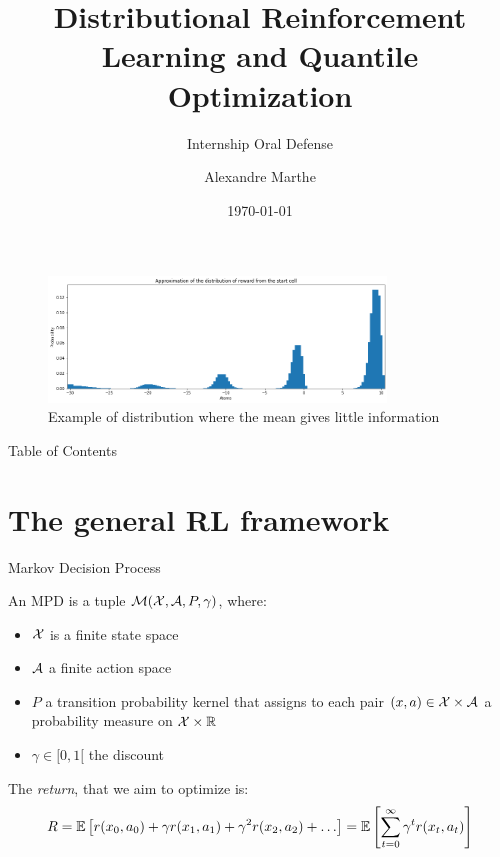 \documentclass[10pt]{beamer}
\title{Distributional Reinforcement Learning and Quantile Optimization}
\subtitle{Internship Oral Defense}
\author{Alexandre Marthe}
\institute{ENS de Lyon}
\date{\today}
\begin{document}

\begin{frame}
\titlepage
\end{frame}

\begin{frame}
    \begin{figure}
        \centering
            \includegraphics[width=0.8\textwidth]{figures/personal_work/distrib_q80.png}
        \caption{Example of distribution where the mean gives little information}
    \end{figure}
\end{frame}

\begin{frame}{Table of Contents}
    \tableofcontents
\end{frame}

\section{The general RL framework}
\begin{frame}{Markov Decision Process\cite{szepesvari2010algorithms}}
    \begin{definition}
        An MPD is a tuple $\mathcal{M}(\mathcal{X}, \mathcal{A}, P, \gamma)$, where:
        \begin{itemize}
            \item $\mathcal{X}$ is a finite state space
            \item $\mathcal{A}$ a finite action space
            \item $P$ a transition probability kernel that assigns to each pair $(x,a) \in \mathcal{X} \times \mathcal{A}$ a probability measure on $\mathcal{X} \times \mathbb{R}$
            \item $\gamma \in [0,1[$ the discount
        \end{itemize}
        
        \end{definition}
        The \emph{return}, that we aim to optimize is:
        \[ R = \EE{ r(x_0, a_0) + \gamma r(x_1, a_1) + \gamma^2 r(x_2, a_2) +  \dots} = \EE{\sum_{t=0}^\infty  \gamma^t r(x_t, a_t)} \]
\end{frame}
\end{document}
